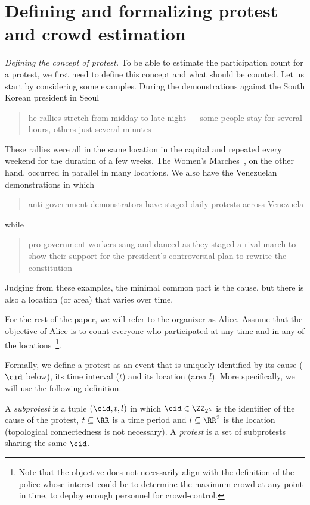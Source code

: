 \section{Defining and formalizing protest and crowd estimation}%
\label{SystemModel}


\emph{Defining the concept of protest.} To be able to estimate the participation count for a protest, we first need to define this concept and what should be counted.
Let us start by considering some examples.
During the demonstrations against the South Korean president in Seoul
\blockcquote{2016DemonstrationsInSeoul}{%
  he rallies stretch from midday to late night --- some people stay for several hours, others just several minutes%
}.
These rallies were all in the same location in the capital and repeated every 
weekend for the duration of a few weeks.
The Women's Marches~\cite{2017WomensMarchesInUS}, on the other hand, occurred in parallel in many locations.
We also have the Venezuelan demonstrations in which
\blockcquote{2017VenezuelaProtestFrequency}{%
  anti-government demonstrators have staged daily protests across Venezuela%
} while
\blockcquote{AlJazeeraOnVenezuela2017}{%
  pro-government workers sang and danced as they staged a rival march to show their support for the president's controversial plan to rewrite the constitution%
}.
Judging from these examples, the minimal common part is the cause,%
\label{CauseIsTheCommonDenominator} but there is also a location (or area) that varies over time.

For the rest of the paper, we will refer to the organizer as Alice.
Assume that the objective of Alice is to count everyone who participated at any time and in any of the locations~\cite{2016DemonstrationsInSeoul}\footnote{Note that the objective does not necessarily align with the definition of the police whose interest could be to determine the maximum crowd at any point in time, to deploy enough personnel for crowd-control.}.

Formally, we define a protest as an event that is uniquely identified by its 
cause (\(\cid\) below), its time interval (\(t\)) and its location (area \(l\)).
More specifically, we will use the following definition.

\begin{definition}[Protest]\label{DefProtest}
  A \emph{subprotest} is a tuple \((\cid, t, l)\) in which \(\cid\in 
    \ZZ_{2^\lambda}\) is the identifier of the cause of the protest,
  \(t \subseteq \RR\) is a time period and \(l \subseteq \RR^2\) is the location 
  (topological connectedness is not necessary).
  A \emph{protest} is a set of subprotests sharing the same \(\cid\).
\end{definition}

